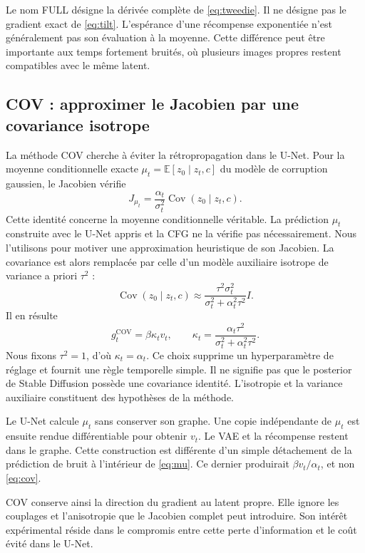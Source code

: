 \documentclass[11pt,a4paper]{article}
\newcommand{\E}{\mathbb{E}}
\newcommand{\Cov}{\operatorname{Cov}}
\begin{document}
Le nom FULL désigne la dérivée complète de \eqref{eq:tweedie}. Il ne désigne pas le gradient exact de \eqref{eq:tilt}. L'espérance d'une récompense exponentiée n'est généralement pas son évaluation à la moyenne. Cette différence peut être importante aux temps fortement bruités, où plusieurs images propres restent compatibles avec le même latent.

\subsection{COV : approximer le Jacobien par une covariance isotrope}
La méthode COV cherche à éviter la rétropropagation dans le U-Net. Pour la moyenne conditionnelle exacte $\mu_t=\E[z_0\mid z_t,c]$ du modèle de corruption gaussien, le Jacobien vérifie
\begin{equation}\label{eq:covidentity}
J_{\mu_t}=\frac{\alpha_t}{\sigma_t^2}\Cov(z_0\mid z_t,c).
\end{equation}
Cette identité concerne la moyenne conditionnelle véritable. La prédiction $\mu_t$ construite avec le U-Net appris et la CFG ne la vérifie pas nécessairement. Nous l'utilisons pour motiver une approximation heuristique de son Jacobien. La covariance est alors remplacée par celle d'un modèle auxiliaire isotrope de variance a priori $\tau^2$ :
\begin{equation}
\Cov(z_0\mid z_t,c)\approx
\frac{\tau^2\sigma_t^2}{\sigma_t^2+\alpha_t^2\tau^2}I.
\end{equation}
Il en résulte
\begin{equation}\label{eq:cov}
g_t^{\mathrm{COV}}=\beta\kappa_tv_t,
\qquad \kappa_t=\frac{\alpha_t\tau^2}{\sigma_t^2+\alpha_t^2\tau^2}.
\end{equation}
Nous fixons $\tau^2=1$, d'où $\kappa_t=\alpha_t$. Ce choix supprime un hyperparamètre de réglage et fournit une règle temporelle simple. Il ne signifie pas que le posterior de Stable Diffusion possède une covariance identité. L'isotropie et la variance auxiliaire constituent des hypothèses de la méthode.

Le U-Net calcule $\mu_t$ sans conserver son graphe. Une copie indépendante de $\mu_t$ est ensuite rendue différentiable pour obtenir $v_t$. Le VAE et la récompense restent dans le graphe. Cette construction est différente d'un simple détachement de la prédiction de bruit à l'intérieur de \eqref{eq:mu}. Ce dernier produirait $\beta v_t/\alpha_t$, et non \eqref{eq:cov}.

COV conserve ainsi la direction du gradient au latent propre. Elle ignore les couplages et l'anisotropie que le Jacobien complet peut introduire. Son intérêt expérimental réside dans le compromis entre cette perte d'information et le coût évité dans le U-Net.
\end{document}
